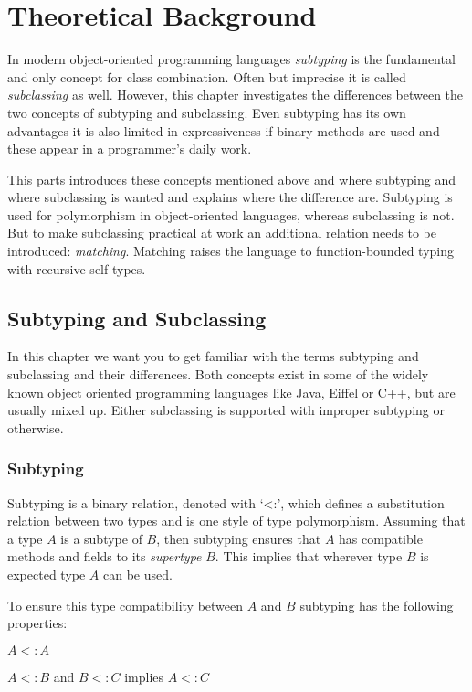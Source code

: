 \chapter{Theoretical Background}
\label{ctr:threticalBackground}
In modern object-oriented programming languages \emph{subtyping} is the
fundamental and only concept for class combination. Often but imprecise it
is called \emph{subclassing}  as well. However, this chapter investigates
the differences between the two concepts of subtyping and subclassing. Even
subtyping has its own advantages it is also limited in expressiveness if
binary methods are used and these appear in a programmer's daily work.

This parts introduces these concepts mentioned above and where subtyping
and where subclassing is wanted and explains where the difference are.
Subtyping is used for polymorphism in object-oriented languages,
whereas subclassing is not. But to make subclassing practical at work
an additional relation needs to be introduced: \emph{matching}. Matching
raises the language to function-bounded typing with recursive self types.

\section{Subtyping and Subclassing}
\label{chap:subtypingVsSubclassing}
In this chapter we want you to get familiar with the terms subtyping
and subclassing and their differences. Both concepts exist in some of
the widely known object oriented programming languages like Java, Eiffel
or C++, but are usually mixed up. Either subclassing is supported with
improper subtyping or otherwise.

\subsection{Subtyping}
Subtyping is a binary relation, denoted with `<:', which defines
a substitution relation between two types and is one style of type
polymorphism. Assuming that a type $A$ is a subtype of $B$, then subtyping
ensures that $A$ has compatible methods and fields to its \emph{supertype}
$B$. This implies that wherever type $B$ is expected type $A$ can be used.

To ensure this type compatibility between $A$ and $B$ subtyping has the
following properties:

\begin{defn}
	\label{def:subtypeReflexivity}
	$A <: A$
\end{defn}
\begin{defn}
	\label{def:subtypeTransitivity}
	$A <: B$ and $B <: C$ implies $A <: C$
\end{defn}

